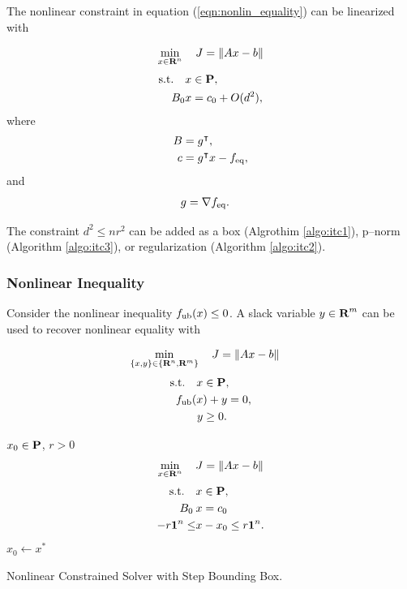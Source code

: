 \documentclass{article}
\begin{document}
    The nonlinear constraint in equation (\ref{eqn:nonlin_equality}) can be linearized with

    \begin{align*}
        \min_{x\in\textbf{R}^n} \quad J = \|Ax-b\|
    \end{align*}
    \begin{align*}
        \text{s.t.} \quad &x\in\textbf{P},\\
        B_{0}&x=c_{0}+O(d^2),
    \end{align*}
    where
    \begin{align*}
        B &= g^\intercal,\\
        c &= g^\intercal x - f_{\text{eq}},
    \end{align*}
    and
    \begin{align*}
        g &= \nabla f_{\text{eq}}.
    \end{align*}

    The constraint $d^2\leq n r^2$ can be added as a box (Algrothim \ref{algo:itc1}),
    p--norm (Algorithm \ref{algo:itc3}), or 
    regularization (Algorithm \ref{algo:itc2}).

    \subsubsection{Nonlinear Inequality}

    Consider the nonlinear inequality $f_{\text{ub}}(x)\leq 0$. 
    A slack variable $y\in\textbf{R}^m$ can be used to recover nonlinear equality with

    \begin{align}
        \min_{\{x,y\}\in\{\textbf{R}^n,\textbf{R}^m\}} \quad J &= \|Ax-b\|
    \end{align}
    \begin{align*}
        \text{s.t.} \quad x&\in\textbf{P},\\
        f_{\text{ub}}(x&)+y =  0,\\
        y&\geq 0.
    \end{align*}

    \begin{algorithm}[H]
        \SetAlgoLined
        $x_0 \in\textbf{P}$, $r>0$\\
        {
            \begin{align*}
                \min_{x\in\textbf{R}^n}\quad J = \|Ax-b\|
            \end{align*}
            \begin{align*}
                \text{s.t.} \quad &x\in\textbf{P},\\
                B_{0}\:&x=c_{0}\\
                -r\textbf{1}^n\leq&x-x_0\leq r\textbf{1}^n.
            \end{align*}
            $x_0\leftarrow x^*$
        }
    \caption{Nonlinear Constrained Solver with Step Bounding Box.}
    \label{algo:itc1}
    \end{algorithm}     
    
\end{document}
